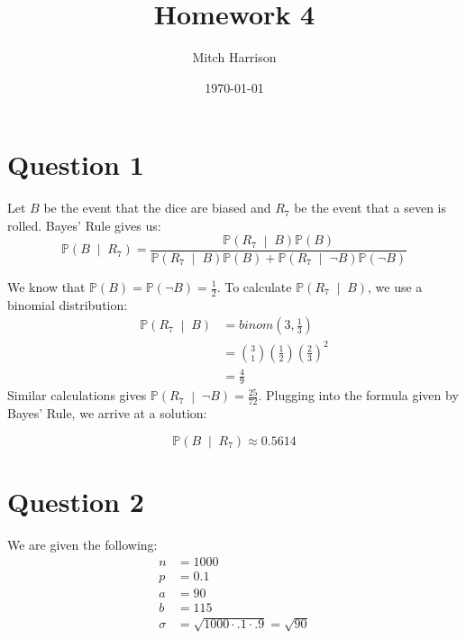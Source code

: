 \documentclass[titlepage, 12pt, leqno]{article}
\title{\Huge{Homework 4}}
\author{\large{Mitch Harrison}}
\date{\today}
\begin{document}
\setlength{\parskip}{1\baselineskip}
\setlength{\parindent}{15pt}
\maketitle
\tableofcontents
\newpage


\section{Question 1}

Let $B$ be the event that the dice are biased and $R_7$ be the event that a
seven is rolled. Bayes' Rule gives us:
\[
\mathbb{P}\left(B \;\middle|\; R_7\right) = \frac{ 
\mathbb{P}\left(R_7 \;\middle|\; B\right) \mathbb{P}(B)}
{ \mathbb{P}\left(R_7 \;\middle|\; B\right) \mathbb{P}(B) +
\mathbb{P}\left(R_7 \;\middle|\; \neg B \right) \mathbb{P}(\neg B)}
\]

We know that $\mathbb{P}(B) = \mathbb{P}(\neg B) = \frac{1}{2}$.
To calculate $ \mathbb{P}\left(R_7 \;\middle|\; B\right) $, we use a binomial 
distribution:
\begin{align*}
    \mathbb{P}\left(R_7 \;\middle|\; B\right) &= binom
    \left(3,\frac{1}{3}\right) \\
                                              &= \binom{3}{1}\left(\frac{1}{2}
                                                  \right)\left(\frac{2}{3} 
                                                      \right)^2 \\
                                              &= \frac{4}{9} 
\end{align*}
Similar calculations gives $ \mathbb{P}\left(R_7 \;\middle|\; \neg B\right) 
= \frac{25}{72} $. Plugging into the formula given by Bayes' Rule, we arrive at
a solution:

\[
    \boxed{ \mathbb{P}\left(B \;\middle|\; R_7\right) \approx 0.5614}
\]
\pagebreak
\section{Question 2}
We are given the following:
\begin{align*}
    n &= 1000 \\
    p &= 0.1 \\
    a &= 90 \\
    b &= 115 \\
    \sigma &= \sqrt{1000 \cdot .1 \cdot .9} = \sqrt{90}
\end{align*}
\end{document}
